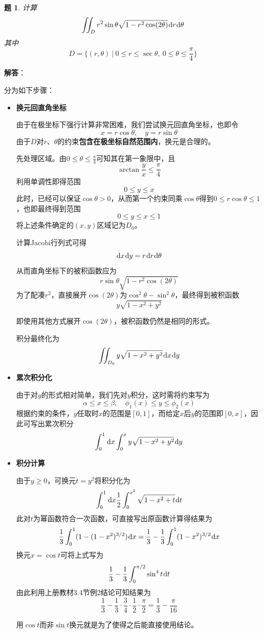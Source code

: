 \documentclass[a4paper,UTF8,fontset=windows,AutoFakeBold]{ctexart}
\newcommand*{\dr}{\hspace{0.07em}\mathrm{d}}
\newcommand*{\note}{\noindent *}
\theoremstyle{ex}
\newtheorem{exercise}{题}
\newcommand{\sol}[1]{{\vspace{5pt}\kaishu\noindent\textbf{解答}：\vspace{-3pt}
\begin{compactitem}
    \item[] #1
\end{compactitem}
}}
\begin{document}
\begin{framed}
\begin{exercise}
    计算
    $$\iint_Dr^2\sin\theta\sqrt{1-r^2\cos(2\theta)}\dr r\dr\theta$$
    其中
    $$D=\bigg\{(r,\theta)\ \bigg|\ 0\le r\le\sec\theta,\ 0\le\theta\le\frac{\pi}{4}\bigg\}$$
\end{exercise}
\sol{
    分为如下步骤：
    \begin{itemize}
        \item \textbf{换元回直角坐标}
        
        由于在极坐标下强行计算非常困难，我们尝试换元回直角坐标，也即令
        $$x=r\cos\theta,\quad y=r\sin\theta$$
        由于$D$对$r$、$\theta$的约束\textbf{包含在极坐标自然范围内}，换元是合理的。

        先处理区域。由$0\le\theta\le\frac{\pi}{4}$可知其在第一象限中，且
        $$\arctan\frac{y}{x}\le\frac{\pi}{4}$$
        利用单调性即得范围
        $$0\le y\le x$$
        此时，已经可以保证$\cos\theta>0$，从而第一个约束同乘$\cos\theta$得到$0\le r\cos\theta\le1$，也即最终得到范围
        $$0\le y\le x\le1$$
        将上述条件确定的$(x,y)$区域记为$D_0$。

        计算Jacobi行列式可得
        $$\dr x\dr y=r\dr r\dr\theta$$
        从而直角坐标下的被积函数应为
        $$r\sin\theta\sqrt{1-r^2\cos(2\theta)}$$
        为了配凑$r^2$，直接展开$\cos(2\theta)$为$\cos^2\theta-\sin^2\theta$，最终得到被积函数
        $$y\sqrt{1-x^2+y^2}$$

        \note 即使用其他方式展开$\cos(2\theta)$，被积函数仍然是相同的形式。

        积分最终化为
        $$\iint_{D_0}y\sqrt{1-x^2+y^2}\dr x\dr y$$

        \item \textbf{累次积分化}
        
        由于对$y$的形式相对简单，我们先对$y$积分，这时需将约束写为
        $$\alpha\le x\le\beta,\quad \phi_1(x)\le y\le\phi_2(x)$$
        根据约束的条件，$y$任取时$x$的范围是$[0,1]$，而给定$x$后$y$的范围即$[0,x]$，因此可写出累次积分
        $$\int_0^1\dr x\int_0^xy\sqrt{1-x^2+y^2}\dr y$$

        \item \textbf{积分计算}
        
        由于$y\ge0$，可换元$t=y^2$将积分化为
        $$\int_0^1\dr x\frac{1}{2}\int_0^{x^2}\sqrt{1-x^2+t}\dr t$$
        此对$t$为幂函数符合一次函数，可直接写出原函数计算得结果为
        $$\frac{1}{3}\int_0^1(1-(1-x^2)^{3/2})\dr x=\frac{1}{3}-\frac{1}{3}\int_0^1(1-x^2)^{3/2}\dr x$$
        换元$x=\cos t$可将上式写为
        $$\frac{1}{3}-\frac{1}{3}\int_0^{\pi/2}\sin^4t\dr t$$
        由此利用上册教材3.4节例2结论可知结果为
        $$\frac{1}{3}-\frac{1}{3}\cdot\frac{3}{4}\cdot\frac{1}{2}\cdot\frac{\pi}{2}=\frac{1}{3}-\frac{\pi}{16}$$

        \note 用$\cos t$而非$\sin t$换元就是为了使得之后能直接使用结论。
    \end{itemize}
}
\end{framed}
\end{document}
